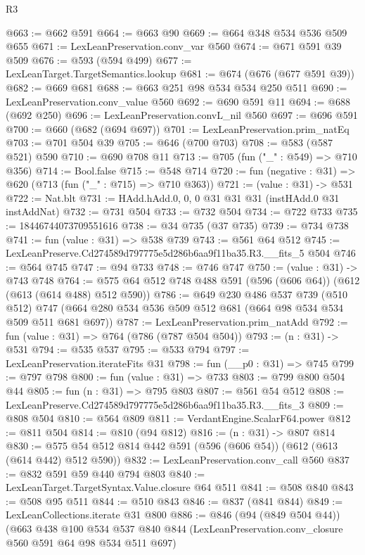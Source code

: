 \begin{lexlean}{R3}
\begin{coremodule}
@663 := @662 @591
@664 := @663 @90
@669 := @664 @348 @534 @536 @509 @655
@671 := LexLeanPreservation.conv_var @560
@674 := @671 @591 @39 @509
@676 := @593 (@594 @499)
@677 := LexLeanTarget.TargetSemantics.lookup
@681 := @674 (@676 (@677 @591 @39))
@682 := @669 @681
@688 := @663 @251 @98 @534 @534 @250 @511
@690 := LexLeanPreservation.conv_value @560
@692 := @690 @591 @11
@694 := @688 (@692 @250)
@696 := LexLeanPreservation.convL_nil @560
@697 := @696 @591
@700 := @660 (@682 (@694 @697))
@701 := LexLeanPreservation.prim_natEq
@703 := @701 @504 @39
@705 := @646 (@700 @703)
@708 := @583 (@587 @521) @590
@710 := @690 @708 @11
@713 := @705 (fun ("_" : @549) => @710 @356)
@714 := Bool.false
@715 := @548 @714
@720 := fun (negative : @31) => @620 (@713 (fun ("_" : @715) => @710 @363))
@721 := (value : @31) -> @531
@722 := Nat.blt
@731 := HAdd.hAdd.{0, 0, 0} @31 @31 @31 (instHAdd.{0} @31 instAddNat)
@732 := @731 @504
@733 := @732 @504
@734 := @722 @733
@735 := 18446744073709551616
@738 := @34 @735 (@37 @735)
@739 := @734 @738
@741 := fun (value : @31) => @538 @739
@743 := @561 @64 @512
@745 := LexLeanPreserve.Cd274589d797775e5d286b6aa9f11ba35.R3.__fits_5 @504
@746 := @564 @745
@747 := @94 @733
@748 := @746 @747
@750 := (value : @31) -> @743 @748
@764 := @575 @64 @512 @748 @488 @591 (@596 (@606 @64)) (@612 (@613 (@614 @488) @512 @590))
@786 := @649
    @230
    @486
    @537
    @739
    (@510 @512)
    @747
    (@664 @280 @534 @536 @509 @512 @681 (@664 @98 @534 @534 @509 @511 @681 @697))
@787 := LexLeanPreservation.prim_natAdd
@792 := fun (value : @31) => @764 (@786 (@787 @504 @504))
@793 := (n : @31) -> @531
@794 := @535 @537
@795 := @533 @794
@797 := LexLeanPreservation.iterateFits @31
@798 := fun (__p0 : @31) => @745
@799 := @797 @798
@800 := fun (value : @31) => @733
@803 := @799 @800 @504 @44
@805 := fun (n : @31) => @795 @803
@807 := @561 @54 @512
@808 := LexLeanPreserve.Cd274589d797775e5d286b6aa9f11ba35.R3.__fits_3
@809 := @808 @504
@810 := @564 @809
@811 := VerdantEngine.ScalarF64.power
@812 := @811 @504
@814 := @810 (@94 @812)
@816 := (n : @31) -> @807 @814
@830 := @575 @54 @512 @814 @442 @591 (@596 (@606 @54)) (@612 (@613 (@614 @442) @512 @590))
@832 := LexLeanPreservation.conv_call @560
@837 := @832 @591 @59 @440 @794 @803
@840 := LexLeanTarget.TargetSyntax.Value.closure @64 @511
@841 := @508 @840
@843 := @508 @95 @511
@844 := @510 @843
@846 := @837 (@841 @844)
@849 := LexLeanCollections.iterate @31 @800
@886 := @846
    (@94 (@849 @504 @44))
    (@663
      @438
      @100
      @534
      @537
      @840
      @844
      (LexLeanPreservation.conv_closure @560 @591 @64 @98 @534 @511 @697)

\end{coremodule}
\end{lexlean}
